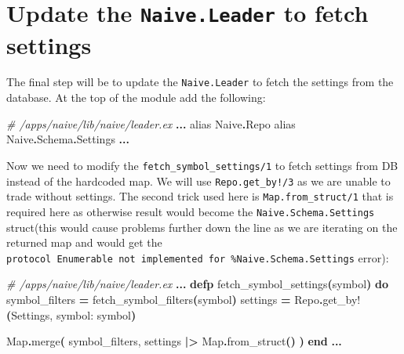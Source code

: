 \documentclass[
  oneside]{book}
\newenvironment{Shaded}{\begin{snugshade}}{\end{snugshade}}
\newcommand{\CommentTok}[1]{\textcolor[rgb]{0.56,0.35,0.01}{\textit{#1}}}
\newcommand{\ConstantTok}[1]{\textcolor[rgb]{0.56,0.35,0.01}{#1}}
\newcommand{\FunctionTok}[1]{\textcolor[rgb]{0.13,0.29,0.53}{\textbf{#1}}}
\newcommand{\ImportTok}[1]{#1}
\newcommand{\KeywordTok}[1]{\textcolor[rgb]{0.13,0.29,0.53}{\textbf{#1}}}
\newcommand{\NormalTok}[1]{#1}
\newcommand{\OperatorTok}[1]{\textcolor[rgb]{0.81,0.36,0.00}{\textbf{#1}}}
\newcommand{\VariableTok}[1]{\textcolor[rgb]{0.00,0.00,0.00}{#1}}
\begin{document}
\section{\texorpdfstring{Update the \texttt{Naive.Leader} to fetch settings}{Update the Naive.Leader to fetch settings}}\label{update-the-naive.leader-to-fetch-settings}

The final step will be to update the \texttt{Naive.Leader} to fetch the settings from the database. At the top of the module add the following:

\begin{Shaded}
\begin{Highlighting}[]
\CommentTok{\# /apps/naive/lib/naive/leader.ex}
  \OperatorTok{...}
  \ImportTok{alias} \ConstantTok{Naive}\OperatorTok{.}\ConstantTok{Repo}
  \ImportTok{alias} \ConstantTok{Naive}\OperatorTok{.}\ConstantTok{Schema}\OperatorTok{.}\ConstantTok{Settings}
  \OperatorTok{...}
\end{Highlighting}
\end{Shaded}

Now we need to modify the \texttt{fetch\_symbol\_settings/1} to fetch settings from DB instead of the hardcoded map. We will use \texttt{Repo.get\_by!/3} as we are unable to trade without settings. The second trick used here is \texttt{Map.from\_struct/1} that is required here as otherwise result would become the \texttt{Naive.Schema.Settings} struct(this would cause problems further down the line as we are iterating on the returned map and would get the \texttt{protocol\ Enumerable\ not\ implemented\ for\ \%Naive.Schema.Settings} error):

\begin{Shaded}
\begin{Highlighting}[]
\CommentTok{\# /apps/naive/lib/naive/leader.ex}
  \OperatorTok{...}
  \KeywordTok{defp}\NormalTok{ fetch\_symbol\_settings}\FunctionTok{(}\NormalTok{symbol}\FunctionTok{)} \KeywordTok{do}
\NormalTok{    symbol\_filters }\OperatorTok{=}\NormalTok{ fetch\_symbol\_filters}\FunctionTok{(}\NormalTok{symbol}\FunctionTok{)}
\NormalTok{    settings }\OperatorTok{=} \ConstantTok{Repo}\OperatorTok{.}\NormalTok{get\_by!}\FunctionTok{(}\ConstantTok{Settings}\NormalTok{, }\VariableTok{symbol:}\NormalTok{ symbol}\FunctionTok{)}

    \ConstantTok{Map}\OperatorTok{.}\NormalTok{merge}\FunctionTok{(}
\NormalTok{      symbol\_filters,}
\NormalTok{      settings }\OperatorTok{|\textgreater{}} \ConstantTok{Map}\OperatorTok{.}\NormalTok{from\_struct}\FunctionTok{()}
    \FunctionTok{)}
  \KeywordTok{end}
  \OperatorTok{...}
\end{Highlighting}
\end{Shaded}
\end{document}
